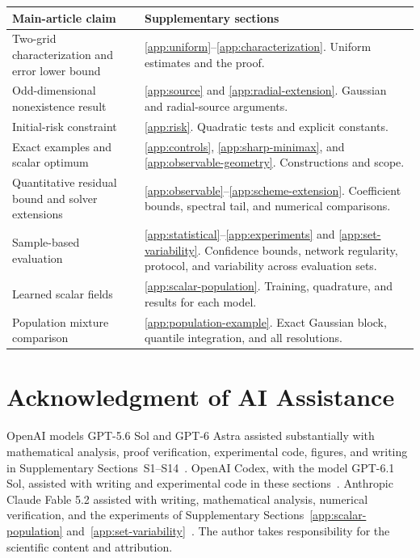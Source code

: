 \begin{center}
\begin{tabular}{@{}p{}p{}@{}}
\toprule
Main-article claim & Supplementary sections\\
\midrule
Two-grid characterization and error lower bound
& \ref{app:uniform}--\ref{app:characterization}. Uniform estimates and the proof.\\
Odd-dimensional nonexistence result
& \ref{app:source} and \ref{app:radial-extension}. Gaussian and radial-source arguments.\\
Initial-risk constraint
& \ref{app:risk}. Quadratic tests and explicit constants.\\
Exact examples and scalar optimum
& \ref{app:controls}, \ref{app:sharp-minimax}, and \ref{app:observable-geometry}. Constructions and scope.\\
Quantitative residual bound and solver extensions
& \ref{app:observable}--\ref{app:scheme-extension}. Coefficient bounds, spectral tail, and numerical comparisons.\\
Sample-based evaluation
& \ref{app:statistical}--\ref{app:experiments} and \ref{app:set-variability}. Confidence bounds, network regularity, protocol, and variability across evaluation sets.\\
Learned scalar fields
& \ref{app:scalar-population}. Training, quadrature, and results for each model.\\
Population mixture comparison
& \ref{app:population-example}. Exact Gaussian block, quantile integration, and all resolutions.\\
\bottomrule
\end{tabular}
\end{center}
\setcounter{section}{0}
\renewcommand{\thesection}{S\arabic{section}}
\renewcommand{\thesubsection}{\thesection-\Alph{subsection}}
\setcounter{equation}{0}
\renewcommand{\theequation}{S\arabic{equation}}
\setcounter{theorem}{0}
\renewcommand{\thetheorem}{S\arabic{theorem}}
\setcounter{definition}{0}
\renewcommand{\thedefinition}{S\arabic{definition}}
\setcounter{table}{0}
\renewcommand{\thetable}{S\arabic{table}}
\renewcommand{\thefigure}{S\arabic{figure}}






\section*{Acknowledgment of AI Assistance}
OpenAI models GPT-5.6 Sol and GPT-6 Astra
assisted substantially with mathematical analysis, proof verification,
experimental code, figures, and writing in Supplementary Sections~S1--S14~\citep{openai_chatgpt,openai_codex}. OpenAI Codex, with the model
GPT-6.1 Sol, assisted with writing and experimental code in these sections~\citep{openai_codex}. Anthropic Claude Fable 5.2 assisted
with writing, mathematical analysis, numerical verification, and the
experiments of Supplementary
Sections~\ref{app:scalar-population} and~\ref{app:set-variability}~\citep{anthropic_claude_fable}.
The author takes responsibility for the scientific content and
attribution.



